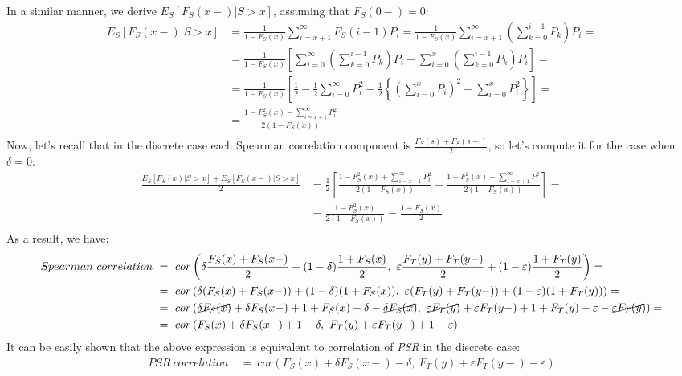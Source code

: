 \documentclass[]{article}
\let\epsilon\varepsilon
\begin{document}
In a similar manner, we derive $E_S[F_S(x-)|S>x]$, assuming that $F_S(0-)=0$:
	$$
	\begin{aligned}
		E_S[F_S(x-)|S>x] &= \frac{1}{1-F_S(x)} \sum_{i=x+1}^{\infty}F_S(i-1)P_i = \frac{1}{1-F_S(x)}\sum_{i=x+1}^{\infty}\left( \sum_{k=0}^{i-1}P_k \right)P_i =\\
		 &= \frac{1}{1-F_S(x)}\left[ \sum_{i=0}^{\infty}\left( \sum_{k=0}^{i-1}P_k \right)P_i - \sum_{i=0}^{x}\left( \sum_{k=0}^{i-1}P_k \right)P_i   \right] = \\
		 &= \frac{1}{1-F_S(x)}\left[ \frac{1}{2} - \frac{1}{2}\sum_{i=0}^{\infty}P_i^2 -  \frac{1}{2} \left\{ \left(\sum_{i=0}^{x}P_i\right)^2 - \sum_{i=0}^{x}P_i^2  \right\}    \right] = \\
		 &= \frac{ 1 - F_S^2(x) - \sum_{i=x+1}^{\infty}P_i^2 }{2(1-F_S(x))}\\
	\end{aligned}
	$$
Now, let's recall that in the discrete case each Spearman correlation component is $\frac{F_S(s) + F_S(s-)}{2}$, so let's compute it for the case when $\delta=0$:
	$$
	\begin{aligned}
	  \frac{E_S[F_S(x)|S>x] + E_S[F_S(x-)|S>x]}{2} &= \frac{1}{2}\left[\frac{ 1 - F_S^2(x) + \sum_{i=x+1}^{\infty}P_i^2 }{2(1-F_S(x))}   +   \frac{ 1 - F_S^2(x) - \sum_{i=x+1}^{\infty}P_i^2 }{2(1-F_S(x))}\right]=\\
		&= \frac{1 - F_S^2(x)}{2(1-F_S(x))}= \frac{1 + F_S(x)}{2}\\
	\end{aligned}
	$$
As a result, we have:
	$$
	\begin{aligned}
		Spearman~correlation~&=~ cor\left(  \delta\frac{F_S(x) + F_S(x-)}{2} + (1-\delta) \frac{1 + F_S(x)}{2}, ~\epsilon\frac{F_T(y) + F_T(y-)}{2} + (1-\epsilon) \frac{1 + F_T(y)}{2} \right)=\\
		&=~ cor\left(  \delta( F_S(x) + F_S(x-)) + (1-\delta) (1 + F_S(x)), ~\epsilon (F_T(y) + F_T(y-)) + (1-\epsilon) (1 + F_T(y)) \right)=\\
		&=~ cor\left( \cancel{\delta F_S(x)} + \delta F_S(x-) +  1 + F_S(x) -\delta - \cancel{\delta F_S(x)}, ~\cancel{\epsilon F_T(y)} + \epsilon F_T(y-) + 1 + F_T(y)-\epsilon -\cancel{\epsilon F_T(y)}   \right)=\\
		&=~ cor\left( F_S(x) + \delta F_S(x-) +  1 -\delta , ~ F_T(y) + \epsilon F_T(y-) + 1 -\epsilon   \right)\\
	\end{aligned}
	$$
It can be easily shown that the above expression is equivalent to correlation of \emph{PSR} in the discrete case:
	$$
	\begin{aligned}
		PSR~correlation~&=~ cor\left(  F_S(x) + \delta F_S(x-) -\delta,~F_T(y) + \epsilon F_T(y-) -\epsilon  \right)\\
	\end{aligned}
	$$
\end{document}
